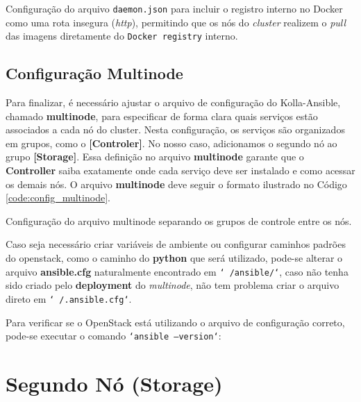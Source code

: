 \begin{listing}[h!]
    \noindent{}  
  \caption{Configuração do arquivo \texttt{daemon.json} para incluir o registro interno no Docker como uma rota insegura (\textit{http}), permitindo que os nós do \textit{cluster} realizem o \textit{pull} das imagens diretamente do \texttt{Docker registry} interno.}
  \label{code:docker_insecure_registry}
\end{listing}


\subsection{Configuração Multinode}
Para finalizar, é necessário ajustar o arquivo de configuração do Kolla-Ansible, chamado \textbf{multinode}, para especificar de forma clara quais serviços estão associados a cada nó do cluster. Nesta configuração, os serviços são organizados em grupos, como o \textbf{[Controler]}. No nosso caso, adicionamos o segundo nó ao grupo \textbf{[Storage]}. Essa definição no arquivo \textbf{multinode} garante que o \textbf{Controller} saiba exatamente onde cada serviço deve ser instalado e como acessar os demais nós. O arquivo \textbf{multinode} deve seguir o formato ilustrado no Código \ref{code:config_multinode}.

\begin{listing}[h!]
    \noindent{}  
  \caption{Configuração do arquivo multinode separando os grupos de controle entre os nós.}
  \label{code:config_multinode}
\end{listing}

Caso seja necessário criar variáveis de ambiente ou configurar caminhos padrões do openstack, como o caminho do \textbf{python} que será utilizado, pode-se alterar o arquivo \textbf{ansible.cfg} naturalmente encontrado em \texttt{`~/ansible/`}, caso não tenha sido criado pelo \textbf{deployment} do \textit{multinode}, não tem problema criar o arquivo direto em \texttt{`~/.ansible.cfg`}. 

Para verificar se o OpenStack está utilizando o arquivo de configuração correto, pode-se executar o comando \texttt{`ansible --version`}:

\section{Segundo Nó (Storage)}

